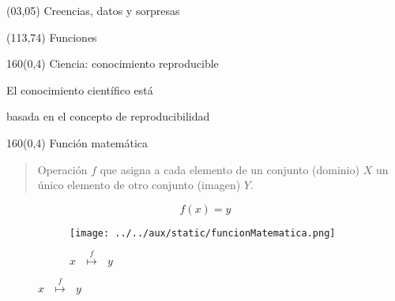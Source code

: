 \documentclass[shownotes,aspectratio=169]{beamer}
\begin{document}
\color{black!85}
\large

 

\begin{frame}
 
 \begin{textblock}{90}(03,05)
 \centering \huge  \textcolor{black!40}{Creencias, datos y sorpresas}
\end{textblock}

 \begin{textblock}{47}(113,74)
\centering \Large  \textcolor{white!55}{Funciones}
\end{textblock}

{}
\end{frame}

\begin{frame}[plain]
 \begin{textblock}{160}(0,4)
 \centering \LARGE Ciencia: conocimiento reproducible
\end{textblock}
\vspace{0.75cm}


 \begin{center} \Large
 El conocimiento científico está 
 
 basada en el concepto de reproducibilidad
 \end{center}
 
 
\end{frame}


\begin{frame}[plain]
\begin{textblock}{160}(0,4)
 \centering \LARGE Función matemática
\end{textblock}
\vspace{1.25cm}
 
\begin{quote}
 Operación $f$ que asigna a cada elemento de un conjunto (dominio) $X$
un único elemento de otro conjunto (imagen) $Y$.
\end{quote}

\begin{equation}
 f(x)=y
\end{equation}

\pause

 \begin{figure}[H]
    \centering
    \begin{subfigure}[t]{0.3\textwidth}
      \texttt{[image: ../../aux/static/funcionMatematica.png]}
            \caption*{$x \ \ \  \overset{f}{\longmapsto} \ \ \  y $}
    \end{subfigure}
\end{figure}
 
\end{frame}
\end{document}

